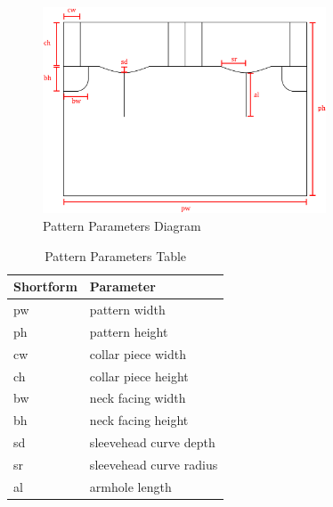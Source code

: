 \begin{figure} [H] %
    \centering %
    \includegraphics[width = 0.75\textwidth]{Images/pattern params.png} %
    \caption{Pattern Parameters Diagram}
\end{figure}
\begin{table} [H] %
    \centering %
    \begin{tabular}{p{2cm}|p{5cm}} %
    
        \textbf{Shortform} & \textbf{Parameter}\\
        \hline %
        pw&  pattern width\\
        ph&  pattern height\\
        cw&  collar piece width\\
        ch&  collar piece height\\
        bw&  neck facing width\\
        bh& neck facing height\\
        sd& sleevehead curve depth\\
        sr& sleevehead curve radius\\
        al& armhole length
        \end{tabular}
    \caption{Pattern Parameters Table}
\end{table}

